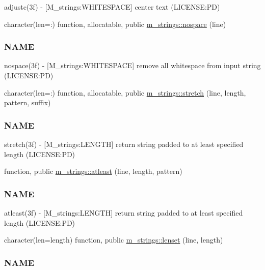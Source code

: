 \begin{DoxyCompactItemize}
\begin{DoxyCompactList}
adjustc(3f) -\/ \mbox{[}M\+\_\+strings\+:W\+H\+I\+T\+E\+S\+P\+A\+CE\mbox{]} center text (L\+I\+C\+E\+N\+SE\+:PD) \end{DoxyCompactList}\item 
character(len=\+:) function, allocatable, public \mbox{\hyperlink{namespacem__strings_ad007f050abe3d142f4a7badbc4408685}{m\+\_\+strings\+::nospace}} (line)
\begin{DoxyCompactList}\small\item\em \subsubsection*{N\+A\+ME}

nospace(3f) -\/ \mbox{[}M\+\_\+strings\+:W\+H\+I\+T\+E\+S\+P\+A\+CE\mbox{]} remove all whitespace from input string (L\+I\+C\+E\+N\+SE\+:PD) \end{DoxyCompactList}\item 
character(len=\+:) function, allocatable, public \mbox{\hyperlink{namespacem__strings_aa67b36ec70dbad84672d3069882929c5}{m\+\_\+strings\+::stretch}} (line, length, pattern, suffix)
\begin{DoxyCompactList}\small\item\em \subsubsection*{N\+A\+ME}

stretch(3f) -\/ \mbox{[}M\+\_\+strings\+:L\+E\+N\+G\+TH\mbox{]} return string padded to at least specified length (L\+I\+C\+E\+N\+SE\+:PD) \end{DoxyCompactList}\item 
function, public \mbox{\hyperlink{namespacem__strings_ab20ba3a07833232eb3c67d4020a7fe64}{m\+\_\+strings\+::atleast}} (line, length, pattern)
\begin{DoxyCompactList}\small\item\em \subsubsection*{N\+A\+ME}

atleast(3f) -\/ \mbox{[}M\+\_\+strings\+:L\+E\+N\+G\+TH\mbox{]} return string padded to at least specified length (L\+I\+C\+E\+N\+SE\+:PD) \end{DoxyCompactList}\item 
character(len=length) function, public \mbox{\hyperlink{namespacem__strings_a378563bb49f128bf0cf9c9d2b1f34498}{m\+\_\+strings\+::lenset}} (line, length)
\begin{DoxyCompactList}\small\item\em \subsubsection*{N\+A\+ME}


\end{DoxyCompactList}
\end{DoxyCompactItemize}
